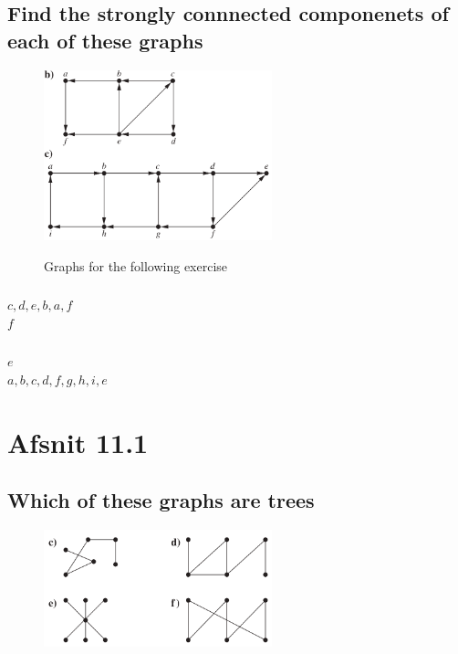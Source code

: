 \documentclass[12pt, a4paper]{report}
\begin{document}
			\subsection{Find the strongly connnected componenets of each of these graphs}
				\begin{figure}[h!]
					\centering
					\includegraphics[width=250px]{assets/10,4,14,bc.png}
					\label{}
				\caption{Graphs for the following exercise}
				\end{figure}
				
				\setcounter{subsubsection}{1}
				\subsubsection{}
					$c,d,e,b,a,f$\\
					$f$\\
				\subsubsection{}
					$e$\\
					$a,b,c,d,f,g,h,i,e$
			\clearpage
			\section{Afsnit 11.1}
				\subsection{Which of these graphs are trees}
					\begin{figure}[h!]
						\centering
						\includegraphics[width=250px]{assets/11,1,1,cef.png}
						\label{}
						\caption{}
					\end{figure}
					\setcounter{subsubsection}{2}
\end{document}
